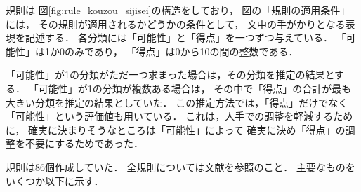 \begin{figure}[t]
\small
  \begin{center}
  \end{center}
\end{figure}

規則は
図\ref{fig:rule_kouzou_sijisei}の構造をしており，
図の「規則の適用条件」には，
その規則が適用されるかどうかの条件として，
文中の手がかりとなる表現を記述する．
各分類には「可能性」と「得点」を一つずつ与えている．
「可能性」は1か0のみであり，
「得点」は0から10の間の整数である．

「可能性」が1の分類がただ一つ求まった場合は，その分類を推定の結果とする．
「可能性」が1の分類が複数ある場合は，
その中で「得点」の合計が最も大きい分類を推定の結果としていた．
この推定方法では，「得点」だけでなく
「可能性」という評価値も用いている．
これは，人手での調整を軽減するために，
確実に決まりそうなところは「可能性」によって
確実に決め「得点」の調整を不要にするためであった．


規則は86個作成していた．
全規則については文献\cite{murata_B}を参照のこと．
主要なものをいくつか以下に示す．

